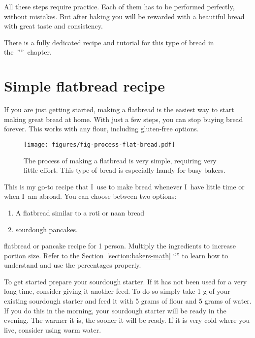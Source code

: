 All these steps require practice. Each of them has to be
performed perfectly, without mistakes.
But after baking you will be rewarded with a beautiful bread
with great taste and consistency.

There is a fully dedicated recipe and tutorial
for this type of bread in the~''''~chapter.

\section{Simple flatbread recipe}%
\label{section:flat-bread-recipe}

If you are just getting started, making a flatbread is the
easiest way to start making great bread at home. With just a
few steps, you can stop buying bread forever. This works with
any flour, including gluten-free options.

\begin{figure}[!htb]
  \texttt{[image: figures/fig-process-flat-bread.pdf]}
  \caption{The process of making a flatbread is very simple, requiring very little effort. This
  type of bread is especially handy for busy bakers.}%
  \label{fig:flat-bread-process}
\end{figure}

This is my go-to recipe that I~use to make bread whenever
I~have little time or when I~am abroad. You can choose
between two options:
%
\begin{enumerate}
    \item A flatbread similar to a roti or naan bread
    \item sourdough pancakes.
\end{enumerate}

\begin{table}[!htb]
    \begin{center}
        
        \caption{\label{tab:flat-bread-ingredients}flatbread or pancake recipe
            for 1 person. Multiply the ingredients to increase portion size.
            Refer to the Section~\ref{section:bakers-math}
            ``'' to learn how to understand and
            use the percentages properly.}
    \end{center}
\end{table}

To get started prepare your sourdough starter. If it has not been used for a very
long time, consider giving it another feed. To do so simply take 1 g of your
existing sourdough starter and feed it with 5 grams of flour and 5 grams of water.
If you do this in the morning, your sourdough starter will be ready in the evening. The
warmer it is, the sooner it will be ready. If it is very cold where you live, consider
using warm water.

